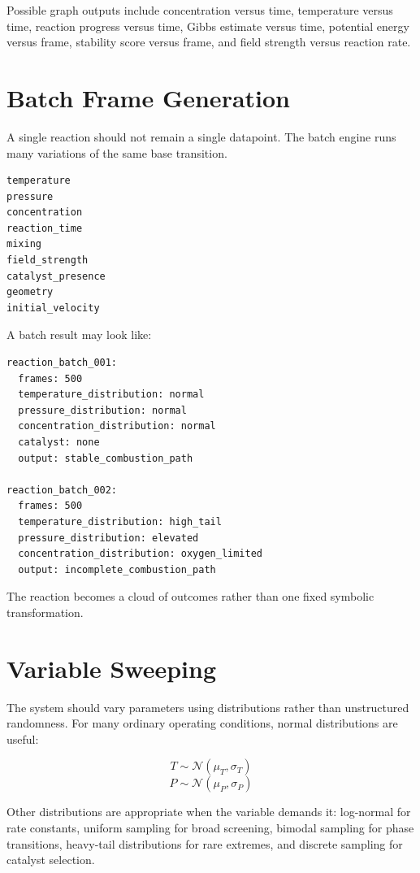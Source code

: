 \documentclass[11pt]{article}
\begin{document}
Possible graph outputs include concentration versus time, temperature versus time, reaction progress versus time, Gibbs estimate versus time, potential energy versus frame, stability score versus frame, and field strength versus reaction rate.

\section{Batch Frame Generation}

A single reaction should not remain a single datapoint. The batch engine runs many variations of the same base transition.

\begin{lstlisting}[caption={Batch variation targets}]
temperature
pressure
concentration
reaction_time
mixing
field_strength
catalyst_presence
geometry
initial_velocity
\end{lstlisting}

A batch result may look like:

\begin{lstlisting}[caption={Example batch definitions}]
reaction_batch_001:
  frames: 500
  temperature_distribution: normal
  pressure_distribution: normal
  concentration_distribution: normal
  catalyst: none
  output: stable_combustion_path

reaction_batch_002:
  frames: 500
  temperature_distribution: high_tail
  pressure_distribution: elevated
  concentration_distribution: oxygen_limited
  output: incomplete_combustion_path
\end{lstlisting}

The reaction becomes a cloud of outcomes rather than one fixed symbolic transformation.

\section{Variable Sweeping}

The system should vary parameters using distributions rather than unstructured randomness. For many ordinary operating conditions, normal distributions are useful:

\[
T \sim \mathcal{N}(\mu_T,\sigma_T)
\]
\[
P \sim \mathcal{N}(\mu_P,\sigma_P)
\]

Other distributions are appropriate when the variable demands it: log-normal for rate constants, uniform sampling for broad screening, bimodal sampling for phase transitions, heavy-tail distributions for rare extremes, and discrete sampling for catalyst selection.
\end{document}
